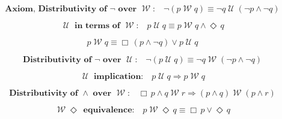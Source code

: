 \documentclass[12pt, fleqn, leqno]{article}
\newcommand{\impl}{\ensuremath{\Rightarrow}}        %
\newcommand{\Until}{\;\mathcal{U}\;}
\newcommand{\Wait}{\;\mathcal{W}\;}
\newcommand{\Event}{\Diamond\,}
\newcommand{\Always}{\Box\,}
\newcommand{\spacer}{\vspace{-30pt}}
\newcommand{\firstspacer}{\vspace{-26pt}}
\begin{document}
\firstspacer

\begin{equation}\label{E:notWait}
\textbf{Axiom, Distributivity of $\neg$ over $\Wait$:}\quad \neg (p \Wait q) \equiv \neg q \Until (\neg p \land \neg q)
\end{equation}

\spacer

\begin{equation}\label{E:untilFromWait}
\textbf{$\Until$ in terms of $\Wait$:}\quad p \Until q \equiv p \Wait q\land \Event q
\end{equation}

\spacer

\begin{equation}\label{E:EmersonEquiv}
p \Wait q  \equiv \Always (p \land \neg q) \lor p \Until q
\end{equation}

\spacer

\begin{equation}\label{E:notUntil}
\textbf{Distributivity of $\neg$ over $\Until$:}\quad \neg (p \Until q) \equiv \neg q \Wait (\neg p \land \neg q)
\end{equation}

\spacer

\begin{equation}\label{E:untilImplWait}
\textbf{$\Until$ implication:}\quad p\Until q\impl p\Wait q
\end{equation}

\spacer

\begin{equation}\label{E:andWaitDist}
\textbf{Distributivity of $\land$ over $\Wait$:}\quad \Always p \land q \Wait r \impl (p \land q) \Wait (p \land r)
\end{equation}

\spacer

\begin{equation}\label{E:EventWaitequiv}
\textbf{$\Wait\Event$ equivalence:}\quad p\Wait\Event q \equiv \Always p \lor \Event q
\end{equation}
\end{document}
